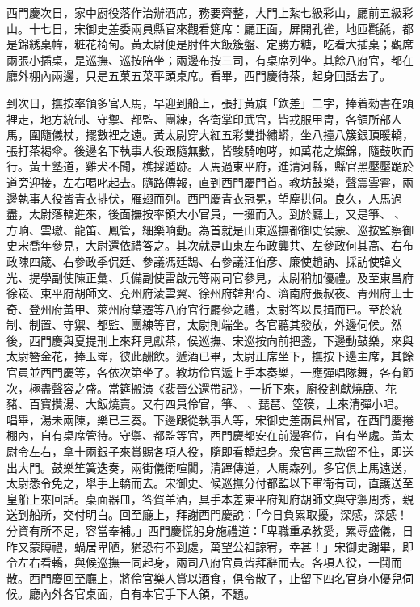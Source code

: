西門慶次日，家中廚役落作治辦酒席，務要齊整，大門上紮七級彩山，廳前五級彩山。十七日，宋御史差委兩員縣官來觀看筵席：廳正面，屏開孔雀，地匝氍毹，都是錦綉桌幃，粧花椅甸。黃太尉便是肘件大飯簇盤、定勝方糖，吃看大插桌；觀席兩張小插桌，是巡撫、巡按陪坐；兩邊布按三司，有桌席列坐。其餘八府官，都在廳外棚內兩邊，只是五菓五菜平頭桌席。看畢，西門慶待茶，起身回話去了。

到次日，撫按率領多官人馬，早迎到船上，張打黃旗「欽差」二字，捧着勑書在頭裡走，地方統制、守禦、都監、團練，各衛掌印武官，皆戎服甲冑，各領所部人馬，圍隨儀杖，擺數裡之遠。黃太尉穿大紅五彩雙掛繡蟒，坐八擡八簇銀頂暖轎，張打茶褐傘。後邊名下執事人役跟隨無數，皆駿騎咆哮，如萬花之燦錦，隨鼓吹而行。黃土塾道，雞犬不聞，樵採遁跡。人馬過東平府，進清河縣，縣官黑壓壓跪於道旁迎接，左右喝叱起去。隨路傳報，直到西門慶門首。教坊鼓樂，聲震雲霄，兩邊執事人役皆青衣排伏，雁翅而列。西門慶青衣冠冕，望塵拱伺。{}良久，人馬過盡，太尉落轎進來，後面撫按率領大小官員，一擁而入。到於廳上，又是箏、𥱧、方晌、雲璈、龍笛、鳳管，細樂响動。為首就是山東巡撫都御史侯蒙、巡按監察御史宋喬年參見，大尉還依禮答之。其次就是山東左布政龔共、左參政何其高、右布政陳四箴、右參政季侃廷、參議馮廷鵠、右參議汪伯彥、廉使趙訥、採訪使韓文光、提學副使陳正彙、兵備副使雷啟元等兩司官參見，太尉稍加優禮。及至東昌府徐崧、東平府胡師文、兗州府淩雲翼、徐州府韓邦奇、濟南府張叔夜、青州府王士奇、登州府黃甲、萊州府葉遷等八府官行廳參之禮，太尉答以長揖而已。至於統制、制置、守禦、都監、團練等官，太尉則端坐。各官聽其發放，外邊伺候。然後，西門慶與夏提刑上來拜見獻茶，{}侯巡撫、宋巡按向前把盞，下邊動鼓樂，來與太尉簪金花，捧玉斝，彼此酬飲。遞酒已畢，太尉正席坐下，撫按下邊主席，其餘官員並西門慶等，各依次第坐了。教坊伶官遞上手本奏樂，一應彈唱隊舞，各有節次，極盡聲容之盛。當筵搬演《裴晉公還帶記》，一折下來，廚役割獻燒鹿、花豬、百寶攢湯、大飯燒賣。又有四員伶官，箏、𥱧、琵琶、箜篌，上來清彈小唱。唱畢，湯未兩陳，樂已三奏。下邊跟從執事人等，宋御史差兩員州官，在西門慶捲棚內，自有桌席管待。守禦、都監等官，西門慶都安在前邊客位，自有坐處。黃太尉令左右，拿十兩銀子來賞賜各項人役，隨即看轎起身。衆官再三款留不住，即送出大門。鼓樂笙簧迭奏，兩街儀衛喧闐，清蹕傳道，人馬森列。多官俱上馬遠送，太尉悉令免之，舉手上轎而去。{}宋御史、候巡撫分付都監以下軍衛有司，直護送至皇船上來回話。桌面器皿，答賀羊酒，具手本差東平府知府胡師文與守禦周秀，親送到船所，交付明白。回至廳上，拜謝西門慶說：「今日負累取擾，深感，深感！分資有所不足，容當奉補。」西門慶慌躬身施禮道：「卑職重承教愛，累辱盛儀，日昨又蒙賻禮，蝸居卑陋，猶恐有不到處，萬望公祖諒宥，幸甚！」宋御史謝畢，即令左右看轎，與候巡撫一同起身，兩司八府官員皆拜辭而去。各項人役，一鬨而散。西門慶回至廳上，將伶官樂人賞以酒食，俱令散了，止留下四名官身小優兒伺候。廳內外各官桌面，自有本官手下人領，{}不題。

